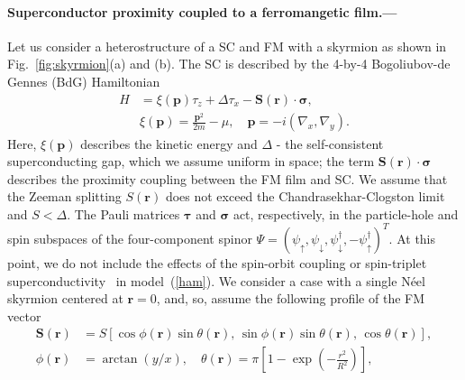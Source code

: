 \documentclass[twocolumn,showpacs,floatfix,longbibliography]{revtex4-1}
\begin{document}
\paragraph*{Superconductor proximity coupled to a ferromangetic film.--- }  \label{sec:model}
Let us consider a heterostructure of a SC and FM with a skyrmion as shown in Fig.~\ref{fig:skyrmion}(a) and (b). The SC is described by the 4-by-4 Bogoliubov-de Gennes (BdG) Hamiltonian
\begin{align}
 H &= \xi(\bm p)\tau_z+\Delta \tau_x - \bm S(\bm r)\cdot\bm\sigma, \label{ham} \\
   & \xi(\bm p) = \frac{\bm p^2}{2m}-\mu,\quad \bm p = -i(\nabla_x,\nabla_y).
\end{align}
Here, $\xi(\bm p)$ describes the kinetic energy and $\Delta$ - the self-consistent superconducting gap, which we assume uniform in space; the term $\bm S(\bm r)\cdot\bm\sigma$ describes the proximity coupling between the FM film and SC. We assume that the Zeeman splitting $S(\bm r)$ does not exceed the Chandrasekhar-Clogston limit and $S<\Delta$. The Pauli matrices $\bm \tau$ and $\bm \sigma$ act, respectively, in the particle-hole and spin subspaces of the four-component spinor $\Psi = (\psi_\uparrow,\psi_\downarrow,\psi^\dagger_\downarrow,-\psi^\dagger_\uparrow)^T$. At this point, we do not include the effects of the spin-orbit coupling or spin-triplet superconductivity~\cite{Note1} in model~(\ref{ham}). We consider a case with a single N\'eel skyrmion centered at $\bm r = 0$, and, so, assume the following profile of the FM vector
\begin{align}
	\bm S(\bm r) &= S\left[ \cos\phi(\bm r) \sin\theta(\bm r),\, \sin\phi(\bm r)\sin\theta(\bm r),\,\cos\theta(\bm r)\right],\nonumber  \\
	\phi(\bm r) &= \arctan(y/x),\quad \theta(\bm r) = \pi \left[ 1-\exp\left( -\frac{r^2}{R^2} \right) \right], \label{conf}
\end{align}
\end{document}
